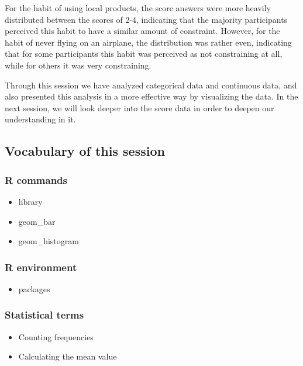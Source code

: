 \documentclass[
]{article}
\providecommand{\tightlist}{%
  \setlength{\itemsep}{0pt}\setlength{\parskip}{0pt}}
\begin{document}
For the habit of using local products, the score answers were more
heavily distributed between the scores of 2-4, indicating that the
majority participants perceived this habit to have a similar amount of
constraint. However, for the habit of never flying on an airplane, the
distribution was rather even, indicating that for some participants this
habit was perceived as not constraining at all, while for others it was
very constraining.

Through this session we have analyzed categorical data and continuous
data, and also presented this analysis in a more effective way by
visualizing the data. In the next session, we will look deeper into the
score data in order to deepen our understanding in it.

\hypertarget{vocabulary-of-this-session}{%
\subsection{Vocabulary of this
session}\label{vocabulary-of-this-session}}

\hypertarget{r-commands}{%
\subsubsection{R commands}\label{r-commands}}

\begin{itemize}
\tightlist
\item
  library
\item
  geom\_bar
\item
  geom\_histogram
\end{itemize}

\hypertarget{r-environment}{%
\subsubsection{R environment}\label{r-environment}}

\begin{itemize}
\tightlist
\item
  packages
\end{itemize}

\hypertarget{statistical-terms}{%
\subsubsection{Statistical terms}\label{statistical-terms}}

\begin{itemize}
\tightlist
\item
  Counting frequencies
\item
  Calculating the mean value
\end{itemize}
\end{document}
